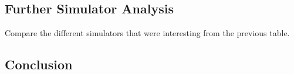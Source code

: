 \subsection{Further Simulator Analysis}
Compare the different simulators that were interesting from the previous table.

\subsection{Conclusion}

